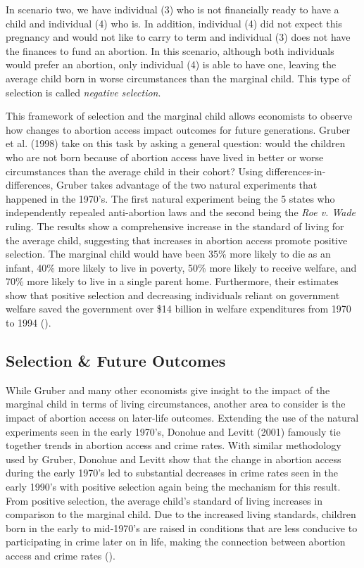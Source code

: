         In scenario two, we have individual (3) who is not financially ready to have a child and individual (4) who is. In addition, individual (4) did not expect this pregnancy and would not like to carry to term and individual (3) does not have the finances to fund an abortion. In this scenario, although both individuals would prefer an abortion, only individual (4) is able to have one, leaving the average child born in worse circumstances than the marginal child. This type of selection is called \textit{negative selection}.

        This framework of selection and the marginal child allows economists to observe how changes to abortion access impact outcomes for future generations. Gruber et al. (1998) take on this task by asking a general question: would the children who are not born because of abortion access have lived in better or worse circumstances than the average child in their cohort? Using differences-in-differences, Gruber takes advantage of the two natural experiments that happened in the 1970's. The first natural experiment being the 5 states who independently repealed anti-abortion laws and the second being the \textit{Roe v. Wade} ruling.
        The results show a comprehensive increase in the standard of living for the average child, suggesting that increases in abortion access promote positive selection. The marginal child would have been 35\% more likely to die as an infant, 40\% more likely to live in poverty, 50\% more likely to receive welfare, and 70\% more likely to live in a single parent home. Furthermore, their estimates show that positive selection and decreasing individuals reliant on government welfare saved the government over \$14 billion in welfare expenditures from 1970 to 1994 (\cite{gruber}).

    \subsection{Selection \& Future Outcomes}
        While Gruber and many other economists give insight to the impact of the marginal child in terms of living circumstances, another area to consider is the impact of abortion access on later-life outcomes. Extending the use of the natural experiments seen in the early 1970's, Donohue and Levitt (2001) famously tie together trends in abortion access and crime rates. With similar methodology used by Gruber, Donohue and Levitt show that the change in abortion access during the early 1970's led to substantial decreases in crime rates seen in the early 1990's with positive selection again being the mechanism for this result. From positive selection, the average child's standard of living increases in comparison to the marginal child. Due to the increased living standards, children born in the early to mid-1970's are raised in conditions that are less conducive to participating in crime later on in life, making the connection between abortion access and crime rates (\cite{levitt}).

